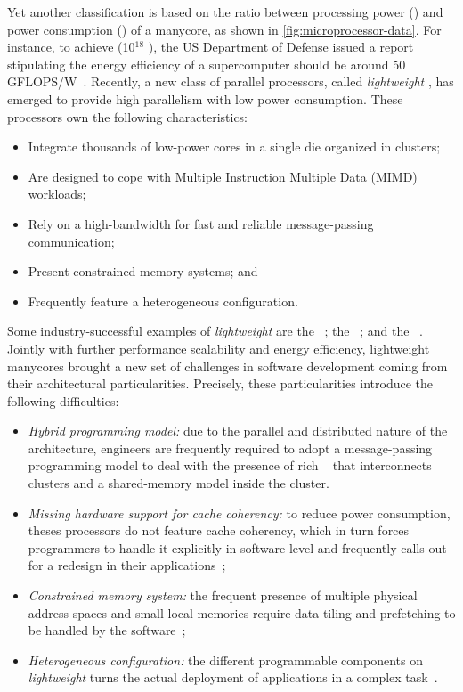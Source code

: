 	Yet another classification is based on the ratio between processing power (\flops)
	and power consumption (\watts) of a manycore, as shown in \autoref{fig:microprocessor-data}.
	For instance, to achieve \exascale (10$^{18}$ \flops), the US Department of Defense
	issued a report stipulating the energy efficiency of a supercomputer should be
	around 50 GFLOPS/W~\cite{darpa:exascale}.
	Recently, a new class of parallel processors, called \textit{lightweight} \manycores,
	has emerged to provide high parallelism with low power consumption.
	These processors own the following characteristics:

	\begin{itemize}
		\item Integrate thousands of low-power cores in a single die organized in clusters;
		\item Are designed to cope with Multiple Instruction Multiple Data (MIMD) workloads;
		\item Rely on a high-bandwidth \noc for fast and reliable message-passing communication;
		\item Present constrained memory systems; and
		\item Frequently feature a heterogeneous configuration.
	\end{itemize}

	Some industry-successful examples of \textit{lightweight} \manycores are
	the \mppa~\cite{DeDinechin2013-1};
	the \epiphany~\cite{olofsson2014}; and
	the \taihulight~\cite{zheng2015}.
	Jointly with further performance scalability and energy efficiency, lightweight manycores brought
	a new set of challenges in software development coming from their architectural particularities.
	Precisely, these particularities introduce the following difficulties:
	\begin{itemize}
		\item \textit{Hybrid programming model:} due to the parallel and distributed nature of
			the architecture, engineers are frequently required to adopt a message-passing
			programming model to deal with the presence of rich \nocs~\cite{kelly2013} that
			interconnects clusters and a shared-memory model inside the cluster.
		\item \textit{Missing hardware support for cache coherency:} to reduce power consumption,
			theses processors do not feature cache coherency, which in turn forces programmers to
			handle it explicitly in software level and frequently calls out for a redesign in their
			applications~\cite{francesquini2015};
		\item \textit{Constrained memory system:} the frequent presence of multiple physical
			address spaces and small local memories require data tiling and prefetching to be
			handled by the software~\cite{Castro2016};
		\item \textit{Heterogeneous configuration:} the different programmable components on
			\textit{lightweight} \manycores turns the actual deployment of applications in a
			complex task~\cite{barbalace2015}.
	\end{itemize}

